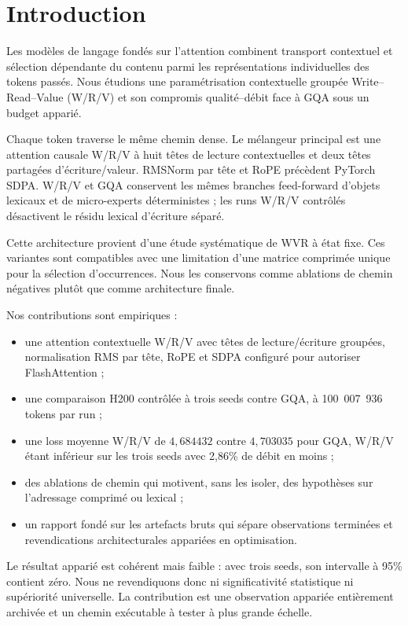 \section{Introduction}

Les modèles de langage fondés sur l'attention combinent transport contextuel et sélection dépendante du contenu parmi les représentations individuelles des tokens passés. Nous étudions une paramétrisation contextuelle groupée Write--Read--Value (W/R/V) et son compromis qualité--débit face à GQA sous un budget apparié.

Chaque token traverse le même chemin dense. Le mélangeur principal est une attention causale W/R/V à huit têtes de lecture contextuelles et deux têtes partagées d'écriture/valeur. RMSNorm par tête et RoPE précèdent PyTorch SDPA. W/R/V et GQA conservent les mêmes branches feed-forward d'objets lexicaux et de micro-experts déterministes ; les runs W/R/V contrôlés désactivent le résidu lexical d'écriture séparé.

Cette architecture provient d'une étude systématique de WVR à état fixe. Ces variantes sont compatibles avec une limitation d'une matrice comprimée unique pour la sélection d'occurrences. Nous les conservons comme ablations de chemin négatives plutôt que comme architecture finale.

Nos contributions sont empiriques :
\begin{itemize}
    \item une attention contextuelle W/R/V avec têtes de lecture/écriture groupées, normalisation RMS par tête, RoPE et SDPA configuré pour autoriser FlashAttention ;
    \item une comparaison H200 contrôlée à trois seeds contre GQA, à 100~007~936 tokens par run ;
    \item une loss moyenne W/R/V de $4,684432$ contre $4,703035$ pour GQA, W/R/V étant inférieur sur les trois seeds avec 2,86\% de débit en moins ;
    \item des ablations de chemin qui motivent, sans les isoler, des hypothèses sur l'adressage comprimé ou lexical ;
    \item un rapport fondé sur les artefacts bruts qui sépare observations terminées et revendications architecturales appariées en optimisation.
\end{itemize}

Le résultat apparié est cohérent mais faible : avec trois seeds, son intervalle à 95\% contient zéro. Nous ne revendiquons donc ni significativité statistique ni supériorité universelle. La contribution est une observation appariée entièrement archivée et un chemin exécutable à tester à plus grande échelle.
